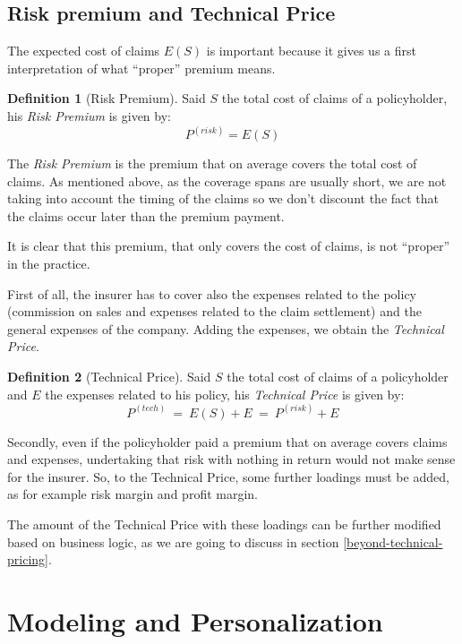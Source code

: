 \documentclass[a4paper, twoside, openright, 12pt]{report}
\theoremstyle{definition}
\newtheorem{definition}{Definition}[chapter]
\theoremstyle{definition}
\theoremstyle{definition}
\theoremstyle{remark}
\begin{document}
\hypertarget{chap:risk-prem-tech-price}{%
\subsection{Risk premium and Technical Price}\label{chap:risk-prem-tech-price}}

The expected cost of claims \(E(S)\) is important because it gives us a first interpretation of what ``proper'' premium means.

\begin{definition}[Risk Premium]
\label{def:risk-premium} \iffalse (Risk Premium) \fi{} Said \(S\) the total cost of claims of a policyholder, his \emph{Risk Premium} is given by:
\[
P^{(risk)} = E(S)
\]
\end{definition}

The \emph{Risk Premium} is the premium that on average covers the total cost of claims. As mentioned above, as the coverage spans are usually short, we are not taking into account the timing of the claims so we don't discount the fact that the claims occur later than the premium payment.

It is clear that this premium, that only covers the cost of claims, is not ``proper'' in the practice.

First of all, the insurer has to cover also the expenses related to the policy (commission on sales and expenses related to the claim settlement) and the general expenses of the company. Adding the expenses, we obtain the \emph{Technical Price}.

\begin{definition}[Technical Price]
\label{def:technical-price} \iffalse (Technical Price) \fi{} Said \(S\) the total cost of claims of a policyholder and \(E\) the expenses related to his policy, his \emph{Technical Price} is given by:
\[
P^{(tech)} \ = \ E(S) + E \ = \ P^{(risk)} + E
\]
\end{definition}

Secondly, even if the policyholder paid a premium that on average covers claims and expenses, undertaking that risk with nothing in return would not make sense for the insurer. So, to the Technical Price, some further loadings must be added, as for example risk margin and profit margin.

The amount of the Technical Price with these loadings can be further modified based on business logic, as we are going to discuss in section \ref{beyond-technical-pricing}.

\hypertarget{chap:personalization}{%
\section{Modeling and Personalization}\label{chap:personalization}}
\end{document}
